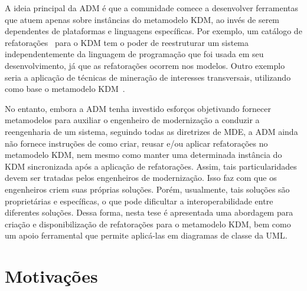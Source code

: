 A ideia principal da ADM é que a comunidade comece a desenvolver ferramentas que atuem apenas sobre instâncias do metamodelo KDM, ao invés de serem dependentes de plataformas e linguagens específicas. Por exemplo, um catálogo de refatorações~\cite{durelli_catalogo} para o KDM tem o poder de reestruturar um sistema independentemente da linguagem de programação que foi usada em seu desenvolvimento, já que as refatorações ocorrem nos modelos. Outro exemplo seria a aplicação de técnicas de mineração de interesses transversais, utilizando como base o metamodelo KDM~\cite{Durelli:2013_ACM, dani_san, daniel_san_journal}.


No entanto, embora a ADM tenha investido esforços objetivando fornecer metamodelos para auxiliar o engenheiro de modernização a conduzir a reengenharia de um sistema, seguindo todas as diretrizes de MDE, a ADM ainda não fornece instruções de como criar, reusar e/ou aplicar refatorações no metamodelo KDM, nem mesmo como manter uma determinada instância do KDM sincronizada após a aplicação de refatorações. Assim, tais particularidades devem ser tratadas pelos engenheiros de modernização. Isso faz com que os engenheiros criem suas próprias soluções. Porém, usualmente, tais soluções são proprietárias e específicas, o que pode dificultar a interoperabilidade entre diferentes soluções. Dessa forma, nesta tese é apresentada uma abordagem para criação e disponibilização de refatorações para o metamodelo KDM, bem como um apoio ferramental que permite aplicá-las em diagramas de classe da UML. 




\section{Motivações}\label{sec:justificativa_e_motivacao}

